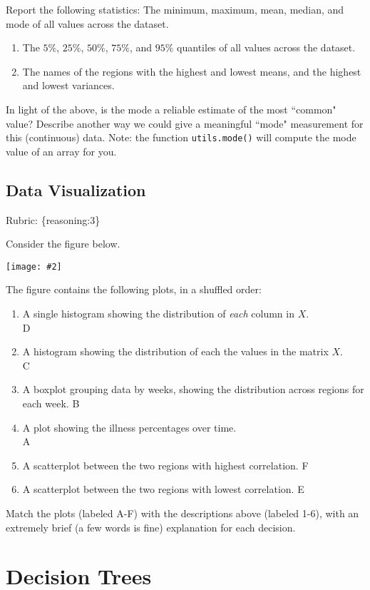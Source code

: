 \documentclass{article}
\def\blu#1{{\color{blu}#1}}
\def\gre#1{{\color{gre}#1}}
\newcommand{\fig}[2]{\texttt{[image: \#2]}}
\def\enum#1{\begin{enumerate}#1\end{enumerate}}
\def\rubric#1{\gre{Rubric: \{#1\}}}{}
\begin{document}
\blu{Report the following statistics}:
The minimum, maximum, mean, median, and mode of all values across the dataset.
\enum{
\item The $5\%$, $25\%$, $50\%$, $75\%$, and $95\%$ quantiles of all values across the dataset.
\item The names of the regions with the highest and lowest means, and the highest and lowest variances.
}
In light of the above, \blu{is the mode a reliable estimate of the most ``common" value? Describe another way we could give a meaningful ``mode" measurement for this (continuous) data.} Note: the function \texttt{utils.mode()} will compute the mode value of an array for you.


\subsection{Data Visualization}
\rubric{reasoning:3}

Consider the figure below.

\fig{1}{../figs/q12visualize-unlabeled}

The figure contains the following plots, in a shuffled order:
\enum{
\item A single histogram showing the distribution of \emph{each} column in $X$.\\
D
\item A histogram showing the distribution of each the values in the matrix $X$.\\
C
\item A boxplot grouping data by weeks, showing the distribution across regions for each week.
B
\item A plot showing the illness percentages over time.\\
A
\item A scatterplot between the two regions with highest correlation.
F
\item A scatterplot between the two regions with lowest correlation.
E
}

\blu{Match the plots (labeled A-F) with the descriptions above (labeled 1-6), with an extremely brief (a few words is fine) explanation for each decision.}





\section{Decision Trees}
\end{document}
